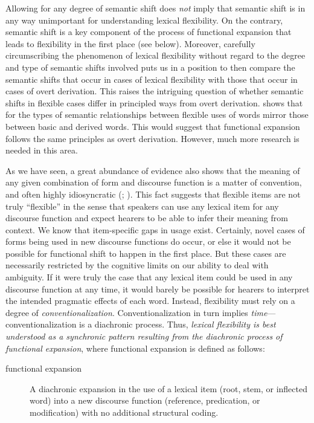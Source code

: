 Allowing for any degree of semantic shift does \emph{not} imply that semantic shift is in any way unimportant for understanding lexical flexibility. On the contrary, semantic shift is a key component of the process of functional expansion that leads to flexibility in the first place (see below). Moreover, carefully circumscribing the phenomenon of lexical flexibility without regard to the degree and type of semantic shifts involved puts us in a position to then compare the semantic shifts that occur in cases of lexical flexibility with those that occur in cases of overt derivation. This raises the intriguing question of whether semantic shifts in flexible cases differ in principled ways from overt derivation. \textcite[165]{Mithun2017} shows that for  the types of semantic relationships between flexible uses of words mirror those between basic and derived words. This would suggest that functional expansion follows the same principles as overt derivation. However, much more research is needed in this area.

As we have seen, a great abundance of evidence also shows that the meaning of any given combination of form and discourse function is a matter of convention, and often highly idiosyncratic (; ). This fact suggests that flexible items are not truly \enquote{flexible} in the sense that speakers can use any lexical item for any discourse function and expect hearers to be able to infer their meaning from context. We know that item-specific gaps in usage exist. Certainly, novel cases of forms being used in new discourse functions do occur, or else it would not be possible for functional shift to happen in the first place. But these cases are necessarily restricted by the cognitive limits on our ability to deal with ambiguity. If it were truly the case that any lexical item could be used in any discourse function at any time, it would barely be possible for hearers to interpret the intended pragmatic effects of each word. Instead, flexibility must rely on a degree of \emph{conventionalization}. Conventionalization in turn implies \emph{time}—conventionalization is a diachronic process. Thus, \emph{lexical flexibility is best understood as a synchronic pattern resulting from the diachronic process of functional expansion}, where functional expansion is defined as follows:

\begin{description}
  \item[functional expansion] A diachronic expansion in the use of a lexical item (root, stem, or inflected word) into a new discourse function (reference, predication, or modification) with no additional structural coding.
\end{description}

